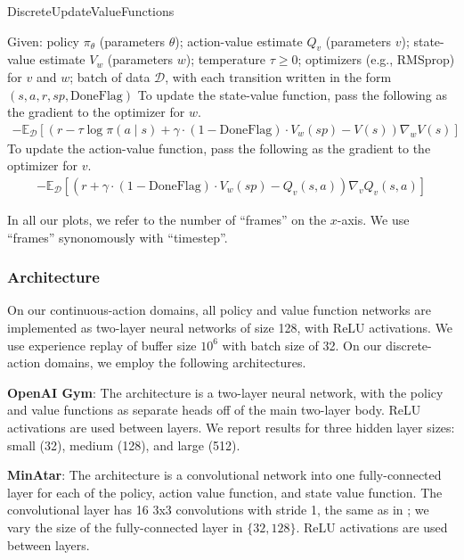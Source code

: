 \documentclass[twoside,11pt]{article}
\newcommand{\Ex}{\mathbb{E}}
\begin{document}
\begin{algorithm}
\caption{DiscreteUpdateValueFunctions}
\label{alg:discrete-value-update}
\begin{algorithmic}
    \State Given: policy $\pi_\theta$ (parameters $\theta$); action-value estimate $Q_v$ (parameters $v$); state-value estimate $V_w$ (parameters $w$); temperature $\tau \geq 0$;  optimizers (e.g., RMSprop) for $v$ and $w$; batch of data $\mathcal{D}$, with each transition written in the form $(s, a, r, sp, \text{DoneFlag})$
    \State To update the state-value function, pass the following as the gradient to the optimizer for $w$. 
    \begin{align*}
        -\Ex_{\mathcal{D}}[(r - \tau \log \pi(a \mid s) + \gamma\cdot (1 - \text{DoneFlag})\cdot V_w(sp) - V(s)) \nabla_w V(s)]
    \end{align*}
    \State To update the action-value function, pass the following as the gradient to the optimizer for $v$. 
    \begin{align*}
        -\Ex_{\mathcal{D}}[(r + \gamma \cdot (1 - \text{DoneFlag})\cdot V_w(sp) - Q_v(s, a)) \nabla_v Q_v(s, a)]
    \end{align*}
\end{algorithmic}
\end{algorithm}

In all our plots, we refer to the number of ``frames'' on the $x$-axis. We use ``frames'' synonomously with ``timestep''. 

\subsubsection{Architecture}
On our continuous-action domains, all policy and value function networks are implemented as two-layer neural networks of size 128, with ReLU activations. We use experience replay of buffer size $10^6$ with batch size of 32. On our discrete-action domains, we employ the following architectures.

\textbf{OpenAI Gym}: The architecture is a two-layer neural network, with the policy and value functions as separate heads off of the main two-layer body. ReLU activations are used between layers. We report results for three hidden layer sizes: small (32), medium (128), and large (512).

\textbf{MinAtar}: The architecture is a convolutional network into one fully-connected layer for each of the policy, action value function, and state value function. The convolutional layer has 16 3x3 convolutions with stride 1, the same as in \citet{young2019minatar}; we vary the size of the fully-connected layer in $\{32, 128\}$. ReLU activations are used between layers. 
\end{document}

